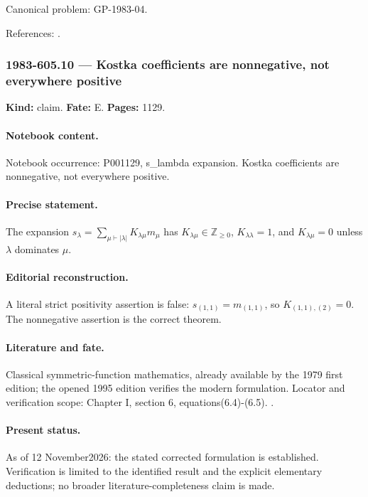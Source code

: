 \noindent Canonical problem: GP-1983-04.\par

\noindent References: \citep{macdonald1995symmetric}.\par

\subsubsection{1983-605.10 --- Kostka coefficients are nonnegative, not everywhere positive}

\label{item:1983-605.10}

\noindent\textbf{Kind:} claim. \textbf{Fate:} E. \textbf{Pages:} 1129.\par

\paragraph{Notebook content.} Notebook occurrence: P001129, s_lambda expansion. Kostka coefficients are nonnegative, not everywhere positive.

\paragraph{Precise statement.} The expansion \(s_\lambda=\sum_{\mu\vdash|\lambda|}K_{\lambda\mu}m_\mu\) has \(K_{\lambda\mu}\in\mathbb Z_{\ge0}\), \(K_{\lambda\lambda}=1\), and \(K_{\lambda\mu}=0\) unless \(\lambda\) dominates \(\mu\).

\paragraph{Editorial reconstruction.} A literal strict positivity assertion is false: \(s_{(1,1)}=m_{(1,1)}\), so \(K_{(1,1),(2)}=0\). The nonnegative assertion is the correct theorem.

\paragraph{Literature and fate.} Classical symmetric-function mathematics, already available by the 1979 first edition; the opened 1995 edition verifies the modern formulation. Locator and verification scope: Chapter I, section 6, equations(6.4)-(6.5). \cite{macdonald1995symmetric}.

\paragraph{Present status.} As of 12 November2026: the stated corrected formulation is established. Verification is limited to the identified result and the explicit elementary deductions; no broader literature-completeness claim is made.

